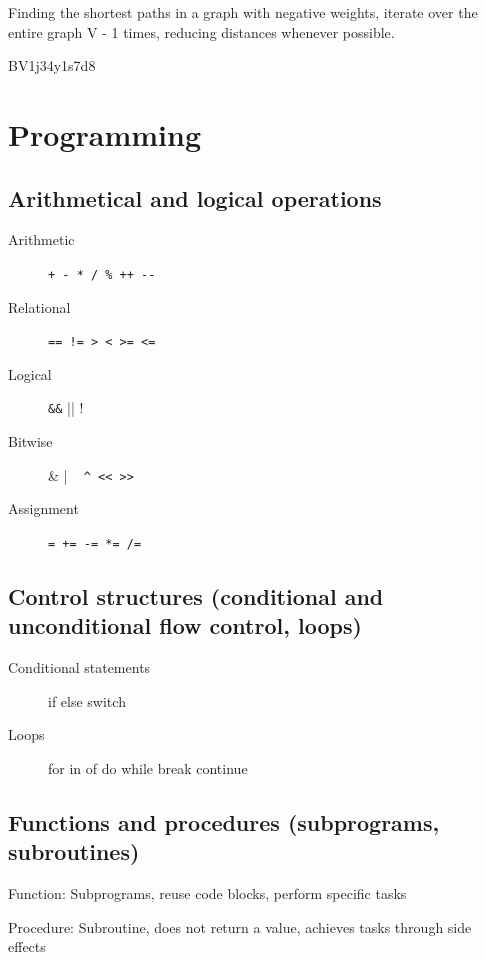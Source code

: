 \documentclass[11pt,journal,compsoc]{IEEEtran}
\begin{document}
Finding the shortest paths in a graph with negative weights, iterate over the entire graph V - 1 times, reducing distances whenever possible.

BV1j34y1s7d8


\section{Programming}


\subsection{Arithmetical and logical operations}

\begin{description}
    \item[Arithmetic] \verb|+ - * / % ++ --|

    \item[Relational] \verb|== != > < >= <=|

    \item[Logical] \verb|&&| || !

    \item[Bitwise] \& | ~ \verb|^ << >>|

    \item[Assignment] \verb|= += -= *= /=|
\end{description}


\subsection{Control structures (conditional and unconditional flow control, loops)}

\begin{description}
    \item[Conditional statements] if else switch

    \item[Loops] for in of do while break continue
\end{description}


\subsection{Functions and procedures (subprograms, subroutines)}

Function: Subprograms, reuse code blocks, perform specific tasks

Procedure: Subroutine, does not return a value, achieves tasks through side effects
\end{document}
